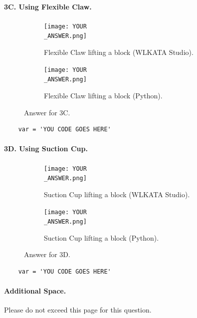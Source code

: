 \newpage
\paragraph{3C. Using Flexible Claw.}
\begin{figure}
    \centering
    \begin{subfigure}[b]{0.3\textwidth}
        \texttt{[image: YOUR\\\_ANSWER.png]}
         \caption*{Flexible Claw lifting a block (WLKATA Studio).}
     \end{subfigure}
     \hfill
     \begin{subfigure}[b]{0.3\textwidth}
        \texttt{[image: YOUR\\\_ANSWER.png]}
         \caption*{Flexible Claw lifting a block (Python).}
     \end{subfigure}
    \caption*{Answer for 3C.}
\end{figure}
%
\begin{verbatim}
    var = 'YOU CODE GOES HERE'
\end{verbatim}


\newpage
\paragraph{3D. Using Suction Cup.}
\begin{figure}
    \centering
    \begin{subfigure}[b]{0.3\textwidth}
        \texttt{[image: YOUR\\\_ANSWER.png]}
         \caption*{Suction Cup lifting a block (WLKATA Studio).}
     \end{subfigure}
     \hfill
     \begin{subfigure}[b]{0.3\textwidth}
        \texttt{[image: YOUR\\\_ANSWER.png]}
         \caption*{Suction Cup lifting a block (Python).}
     \end{subfigure}
    \caption*{Answer for 3D.}
\end{figure}
%
\begin{verbatim}
    var = 'YOU CODE GOES HERE'
\end{verbatim}


\newpage
\paragraph{Additional Space.}
Please do not exceed this page for this question.
